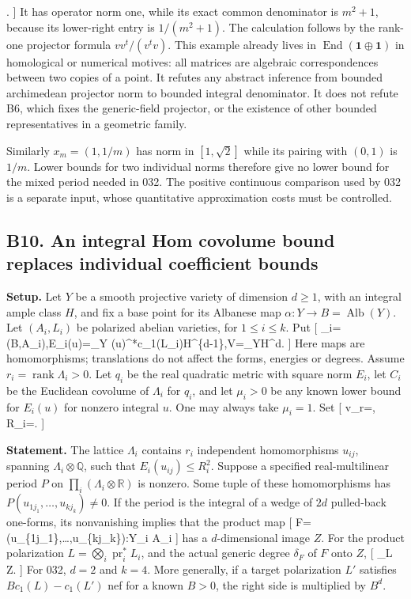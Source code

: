 \documentclass[11pt,a4paper]{article}
\theoremstyle{definition}
\begin{document}
. {]} It has operator norm one, while its exact common denominator is
\(m^2+1\), because its lower-right entry is \(1/(m^2+1)\). The
calculation follows by the rank-one projector formula \(vv^t/(v^tv)\).
This example already lives in
\(\operatorname{End}(\mathbf1\oplus\mathbf1)\) in homological or
numerical motives: all matrices are algebraic correspondences between
two copies of a point. It refutes any abstract inference from bounded
archimedean projector norm to bounded integral denominator. It does not
refute B6, which fixes the generic-field projector, or the existence of
other bounded representatives in a geometric family.

Similarly \(x_m=(1,1/m)\) has norm in \([1,\sqrt2]\) while its pairing
with \((0,1)\) is \(1/m\). Lower bounds for two individual norms
therefore give no lower bound for the mixed period needed in 032. The
positive continuous comparison used by 032 is a separate input, whose
quantitative approximation costs must be controlled.

\subsection{B10. An integral Hom covolume bound replaces individual
coefficient
bounds}\label{b10.-an-integral-hom-covolume-bound-replaces-individual-coefficient-bounds}

\textbf{Setup.} Let \(Y\) be a smooth projective variety of dimension
\(d\ge1\), with an integral ample class \(H\), and fix a base point for
its Albanese map \(\alpha:Y\to B=\operatorname{Alb}(Y)\). Let
\((A_i,L_i)\) be polarized abelian varieties, for \(1\le i\le k\). Put
{[} \Lambda\_i=(B,A\_i),\qquad E\_i(u)=\int\_Y
(u\alpha)\^{}*c\_1(L\_i)H\^{}\{d-1\},\qquad V=\int\_YH\^{}d. {]} Here
maps are homomorphisms; translations do not affect the forms, energies
or degrees. Assume \(r_i=\operatorname{rank}\Lambda_i>0\). Let \(q_i\)
be the real quadratic metric with square norm \(E_i\), let \(C_i\) be
the Euclidean covolume of \(\Lambda_i\) for \(q_i\), and let \(\mu_i>0\)
be any known lower bound for \(E_i(u)\) for nonzero integral \(u\). One
may always take \(\mu_i=1\). Set {[}
v\_r=,\qquad
R\_i=. {]}

\textbf{Statement.} The lattice \(\Lambda_i\) contains \(r_i\)
independent homomorphisms \(u_{ij}\), spanning
\(\Lambda_i\otimes\mathbb Q\), such that \(E_i(u_{ij})\le R_i^2\).
Suppose a specified real-multilinear period \(P\) on
\(\prod_i(\Lambda_i\otimes\mathbb R)\) is nonzero. Some tuple of these
homomorphisms has \(P(u_{1j_1},\ldots,u_{kj_k})\ne0\). If the period is
the integral of a wedge of \(2d\) pulled-back one-forms, its
nonvanishing implies that the product map {[}
F=(u\_\{1j\_1\}\alpha,\ldots,u\_\{kj\_k\}\alpha):Y\longrightarrow\prod\_i
A\_i {]} has a \(d\)-dimensional image \(Z\). For the product
polarization \(L=\bigotimes_i\operatorname{pr}_i^*L_i\), and the actual
generic degree \(\delta_F\) of \(F\) onto \(Z\), {[} \deg\_L
Z\le{}.  {]} For 032,
\(d=2\) and \(k=4\). More generally, if a target polarization \(L'\)
satisfies \(B c_1(L)-c_1(L')\) nef for a known \(B>0\), the right side
is multiplied by \(B^d\).
\end{document}
